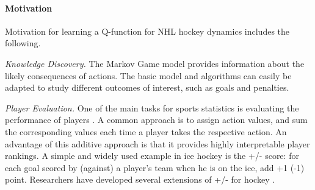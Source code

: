 \documentclass[]{article}
\begin{document}
\paragraph{Motivation}
Motivation for learning a Q-function for NHL hockey dynamics includes the following.

{\em Knowledge Discovery.} The Markov Game model provides information about the likely consequences of actions. The basic model and algorithms can easily be adapted to study different outcomes of interest, such as goals and penalties.

{\em Player Evaluation.} One of the main tasks for sports statistics is evaluating the performance of players \citep{Schumaker2010}.
A common approach is to assign action values, and sum the corresponding values each time a player takes the respective action.
An advantage of this additive approach is that it provides highly interpretable player rankings. A simple and widely used example in ice hockey is the +/- score: for each goal scored by (against) a player's team when he is on the ice, add +1 (-1) point. Researchers have developed several extensions of +/- for hockey \citep{Macdonald2011a,Spagnola2013,Schuckers2013}. %
\end{document}
